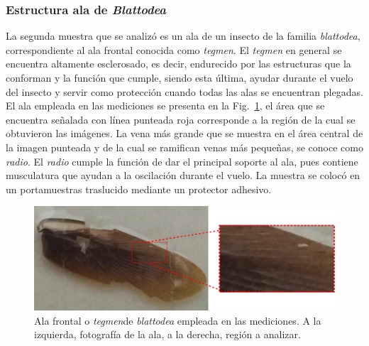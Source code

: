 \newpage

\subsubsection{Estructura ala de \textit{Blattodea}}


La segunda muestra que se analizó es un ala \exvivo de un insecto de la familia \emph{blattodea}, correspondiente al ala frontal conocida como \emph{tegmen}. El \emph{tegmen} en general se encuentra altamente esclerosado, es decir, endurecido por las estructuras que la conforman y la función que cumple, siendo esta última, ayudar durante el vuelo del insecto y servir como protección cuando todas las alas se encuentran plegadas. El ala empleada en las mediciones se presenta en la Fig.~\ref{fig:blattoawingzoomed}, el área que se encuentra señalada con línea punteada roja corresponde a la región de la cual se obtuvieron las imágenes. La vena más grande que se muestra en el área central de la imagen punteada y de la cual se ramifican venas más pequeñas, se conoce como \emph{radio}. El \emph{radio} cumple la función de dar el principal soporte al ala, pues contiene musculatura que ayudan a la oscilación durante el vuelo. La muestra se colocó en un portamuestras traslucido mediante un protector adhesivo.

\begin{figure}[h!]
	\centering
	\includegraphics[width=0.7\linewidth]{img/chap2/BlattoaWingZoomed}
	\caption[Ala frontal o \emph{tegmen} de \emph{blattodea}.]{Ala frontal o \emph{tegmen}de \emph{blattodea} empleada en las mediciones. A la izquierda, fotografía de la ala, a la derecha, región a analizar.}
	\label{fig:blattoawingzoomed}
\end{figure}


